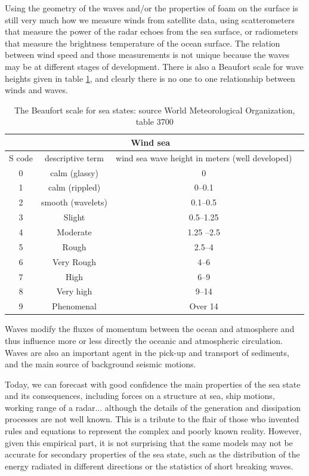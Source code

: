  Using the geometry of the waves and/or the properties of foam on the surface is still very much how we measure winds from satellite data, using scatterometers that measure the power of the radar echoes from the sea surface, or radiometers that measure the brightness temperature of the ocean surface. The relation between wind speed and those measurements
  is not unique because the waves may be at different stages of development. There is also a Beaufort scale for wave heights given in table \ref{table_seastate}, and clearly there is no one to one relationship between winds and waves. 


\begin{table}
  \centering
  \begin{tabular}{|c|c|c|c|}
\hline
    \multicolumn{3}{|c|}{Wind sea} \\
 \hline
S code & descriptive term & wind sea wave height in meters (well developed)  \\
0 & calm (glassy)         & 0 \\
1 & calm (rippled)        & 0--0.1\\
2 & smooth (wavelets)     & 0.1--0.5 \\
3 & Slight                & 0.5--1.25  \\
4 & Moderate              & 1.25 --2.5  \\
5 & Rough                 & 2.5--4 \\
6 & Very Rough            & 4--6  \\
7 & High                  & 6--9 \\
8 & Very high             & 9--14  \\
9 & Phenomenal            & Over 14  \\
\hline
\end{tabular}
\caption{The Beaufort scale for sea states: source World Meteorological Organization, table 3700 \label{table_beaufort}}
\label{table_seastate}
\end{table}


Waves modify the fluxes of momentum between the ocean and atmosphere and thus influence more or less directly the oceanic and 
atmospheric circulation. Waves are also an important agent in the pick-up and transport of sediments, and 
the main source of background seismic motions. 


Today, we can forecast with good confidence the main properties of the sea state and its consequences, including forces on a structure 
at sea, ship motions, working range of a radar... although the details of the generation and dissipation processes are not well known. 
This is a tribute to the flair of those who invented rules and equations to represent the complex and poorly known reality. 
However, given this empirical part, it is not surprising that the same models may not be accurate for secondary properties of the sea state, such as the distribution 
of the energy radiated in different directions or the statistics of short breaking waves. 


